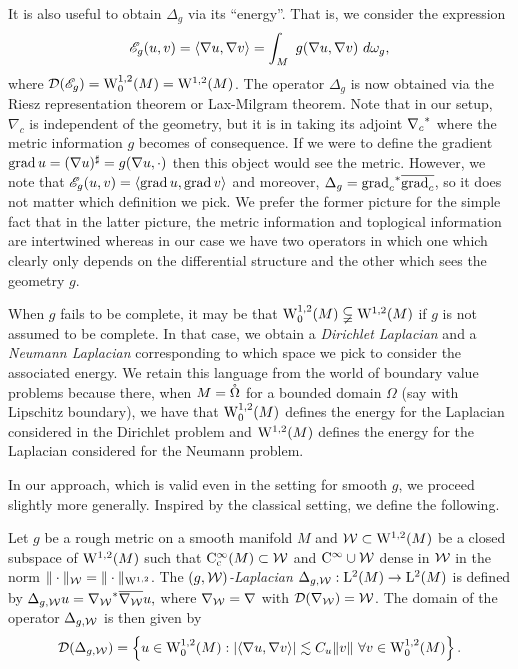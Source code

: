 \documentclass[a4paper, 12pt]{amsart}
\begin{document}
It is also useful to obtain $\Delta_g$ via its ``energy''. 
That is,  we consider the expression 
$$\sE_g(u,v) = \inprod{\nabla u, \nabla v} = \int_M\ g(\nabla u, \nabla v)\ d\omega_g,$$
where $\dom(\sE_g) = \SobH[0]{1}(M) = \SobH{1}(M)$.
The operator $\Delta_g$ is now obtained via the Riesz representation theorem
or Lax-Milgram theorem.
Note that in our setup, $\nabla_c$ is independent of the geometry,
but it is in taking its adjoint $\adj{\nabla_c}$ where the
metric information $g$ becomes of consequence. If we were
to define the gradient $\grad u =  (\nabla u)^\sharp = g(\nabla u, \cdot)$
then this object would see the metric. However,
we note that 
$\sE_g(u,v) = \inprod{\grad u, \grad v}$
and moreover, $\Delta_g = \adj{\grad_c} \close{\grad_c}$, 
so it does not matter which definition we pick.
We prefer the former picture for the
simple fact that in the latter picture, the metric information
and toplogical information are intertwined whereas 
in our case we have two operators in which one which clearly only depends
on the differential structure and the other which sees the geometry $g$.

When $g$ fails to be complete, it may be that  
$\SobH[0]{1}(M) \subsetneqq  \SobH{1}(M)$
if $g$ is not assumed to be complete. 
In that case, we obtain a \emph{Dirichlet Laplacian} and  a \emph{Neumann 
Laplacian} corresponding to which space we pick 
to consider the associated energy.
We retain this language from the world of boundary 
value problems because there, when $M = \interior\Omega$
for a bounded domain $\Omega$ (say with Lipschitz boundary), we have that
$\SobH[0]{1}(M)$ defines the energy for
the Laplacian considered in the Dirichlet problem
and $\SobH{1}(M)$ defines the energy 
for the Laplacian considered for the Neumann problem.

In our approach, which is valid even in the setting
for smooth $g$, we proceed slightly more generally. 
Inspired by the classical setting, we define
the following.
 
\begin{defn}[$(g,\cW)$-Laplacian]
Let \(g\) be a rough metric on a smooth manifold \(M\)
and $\cW \subset \SobH{1}(M)$ be a closed subspace
of $\SobH{1}(M)$ such that $\Ck[c]{\infty}(M) \subset \cW$
and $\Ck{\infty} \cup \cW$ dense in $\cW$ 
in the norm $\norm{\cdot}_{\cW} = \norm{\cdot}_{\SobH{1}}$. 
The \emph{$(g,\cW)$-Laplacian}
\(\Delta_{g,\cW} : \Lp{2}(M) \to \Lp{2}(M)\) is defined by
$\Delta_{g,\cW} u = \adj{\nabla_{\cW}} \close{ \nabla_{\cW}} u,$
where  $\nabla_{\cW} = \nabla$ with $\dom(\nabla_{\cW}) = \cW$. 
The domain of the operator $\Delta_{g,\cW}$ is then given by
$$\dom(\Delta_{g,\cW}) = \set{u \in \SobH[0]{1}(M): \modulus{\inprod{\nabla u, \nabla v}} \lesssim C_u \norm{v}\ \forall v \in \SobH[0]{1}(M)}.$$
\end{defn}
\end{document}
